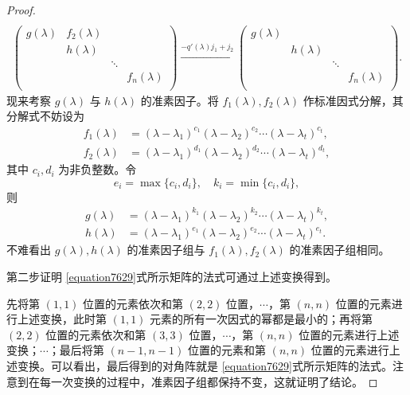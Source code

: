 \documentclass[../../main.tex]{subfiles}
\begin{document}
\begin{proof}
\begin{gather*}
\\
\left( \begin{matrix}
g(\lambda )&		f_2\left( \lambda \right)&		&		\\
&		h(\lambda )&		&		\\
&		&		\ddots&		\\
&		&		&		f_n(\lambda )\\
\end{matrix} \right) \xrightarrow{-q\prime (\lambda )j_1+j_2}\left( \begin{matrix}
g(\lambda )&		&		&		\\
&		h(\lambda )&		&		\\
&		&		\ddots&		\\
&		&		&		f_n(\lambda )\\
\end{matrix} \right) .
\end{gather*}
现来考察 $g(\lambda)$ 与 $h(\lambda)$ 的准素因子。将 $f_1(\lambda), f_2(\lambda)$ 作标准因式分解，其分解式不妨设为
\begin{align*}
f_1(\lambda)&=(\lambda - \lambda_1)^{c_1}(\lambda - \lambda_2)^{c_2}\cdots(\lambda - \lambda_t)^{c_t},\\
f_2(\lambda)&=(\lambda - \lambda_1)^{d_1}(\lambda - \lambda_2)^{d_2}\cdots(\lambda - \lambda_t)^{d_t},
\end{align*}
其中 $c_i, d_i$ 为非负整数。令
\[
e_i = \max\{c_i, d_i\},\quad k_i = \min\{c_i, d_i\},
\]
则
\begin{align*}
g(\lambda)&=(\lambda - \lambda_1)^{k_1}(\lambda - \lambda_2)^{k_2}\cdots(\lambda - \lambda_t)^{k_t},\\
h(\lambda)&=(\lambda - \lambda_1)^{e_1}(\lambda - \lambda_2)^{e_2}\cdots(\lambda - \lambda_t)^{e_t}.
\end{align*}
不难看出 $g(\lambda), h(\lambda)$ 的准素因子组与 $f_1(\lambda), f_2(\lambda)$ 的准素因子组相同。 

第二步证明 \eqref{equation7629}式所示矩阵的法式可通过上述变换得到。

先将第 $(1,1)$ 位置的元素依次和第 $(2,2)$ 位置，$\cdots$，第 $(n,n)$ 位置的元素进行上述变换，此时第 $(1,1)$ 元素的所有一次因式的幂都是最小的；再将第 $(2,2)$ 位置的元素依次和第 $(3,3)$ 位置，$\cdots$，第 $(n,n)$ 位置的元素进行上述变换；$\cdots$；最后将第 $(n - 1,n - 1)$ 位置的元素和第 $(n,n)$ 位置的元素进行上述变换。可以看出，最后得到的对角阵就是 \eqref{equation7629}式所示矩阵的法式。注意到在每一次变换的过程中，准素因子组都保持不变，这就证明了结论。
\end{proof}
\end{document}
